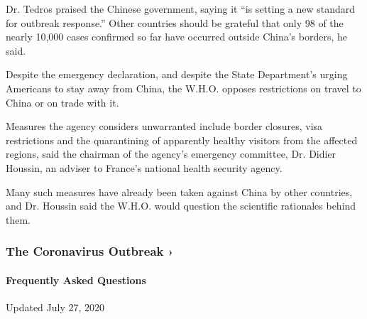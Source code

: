 Dr. Tedros praised the Chinese government, saying it ``is setting a new
standard for outbreak response.'' Other countries should be grateful
that only 98 of the nearly 10,000 cases confirmed so far have occurred
outside China's borders, he said.

Despite the emergency declaration, and despite the State Department's
urging Americans to stay away from China, the W.H.O. opposes
restrictions on travel to China or on trade with it.

Measures the agency considers unwarranted include border closures, visa
restrictions and the quarantining of apparently healthy visitors from
the affected regions, said the chairman of the agency's emergency
committee, Dr. Didier Houssin, an adviser to France's national health
security agency.

Many such measures have already been taken against China by other
countries, and Dr. Houssin said the W.H.O. would question the scientific
rationales behind them.

\href{https://www.nytimes.com/news-event/coronavirus?action=click\&pgtype=Article\&state=default\&region=MAIN_CONTENT_3\&context=storylines_faq}{}

\hypertarget{the-coronavirus-outbreak-}{%
\subsubsection{The Coronavirus Outbreak
›}\label{the-coronavirus-outbreak-}}

\hypertarget{frequently-asked-questions}{%
\paragraph{Frequently Asked
Questions}\label{frequently-asked-questions}}

Updated July 27, 2020

